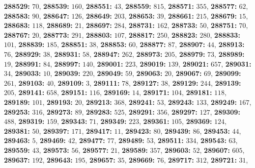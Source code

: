 \textsf{\bfseries 288529:} $70$, \textsf{\bfseries 288539:} $160$, \textsf{\bfseries 288551:} $43$, \textsf{\bfseries 288559:} $815$, \textsf{\bfseries 288571:} $355$, \textsf{\bfseries 288577:} $62$, \textsf{\bfseries 288583:} $90$, \textsf{\bfseries 288647:} $126$, \textsf{\bfseries 288649:} $203$, \textsf{\bfseries 288653:} $39$, \textsf{\bfseries 288661:} $215$, \textsf{\bfseries 288679:} $15$, \textsf{\bfseries 288683:} $118$, \textsf{\bfseries 288689:} $21$, \textsf{\bfseries 288697:} $284$, \textsf{\bfseries 288731:} $162$, \textsf{\bfseries 288733:} $50$, \textsf{\bfseries 288751:} $70$, \textsf{\bfseries 288767:} $20$, \textsf{\bfseries 288773:} $291$, \textsf{\bfseries 288803:} $107$, \textsf{\bfseries 288817:} $250$, \textsf{\bfseries 288823:} $280$, \textsf{\bfseries 288833:} $101$, \textsf{\bfseries 288839:} $185$, \textsf{\bfseries 288851:} $38$, \textsf{\bfseries 288853:} $60$, \textsf{\bfseries 288877:} $87$, \textsf{\bfseries 288907:} $44$, \textsf{\bfseries 288913:} $76$, \textsf{\bfseries 288929:} $38$, \textsf{\bfseries 288931:} $58$, \textsf{\bfseries 288947:} $262$, \textsf{\bfseries 288973:} $205$, \textsf{\bfseries 288979:} $73$, \textsf{\bfseries 288989:} $19$, \textsf{\bfseries 288991:} $84$, \textsf{\bfseries 288997:} $140$, \textsf{\bfseries 289001:} $223$, \textsf{\bfseries 289019:} $139$, \textsf{\bfseries 289021:} $657$, \textsf{\bfseries 289031:} $34$, \textsf{\bfseries 289033:} $10$, \textsf{\bfseries 289039:} $220$, \textsf{\bfseries 289049:} $59$, \textsf{\bfseries 289063:} $20$, \textsf{\bfseries 289067:} $69$, \textsf{\bfseries 289099:} $261$, \textsf{\bfseries 289103:} $40$, \textsf{\bfseries 289109:} $3$, \textsf{\bfseries 289111:} $78$, \textsf{\bfseries 289127:} $38$, \textsf{\bfseries 289129:} $244$, \textsf{\bfseries 289139:} $205$, \textsf{\bfseries 289141:} $658$, \textsf{\bfseries 289151:} $116$, \textsf{\bfseries 289169:} $14$, \textsf{\bfseries 289171:} $104$, \textsf{\bfseries 289181:} $118$, \textsf{\bfseries 289189:} $101$, \textsf{\bfseries 289193:} $20$, \textsf{\bfseries 289213:} $368$, \textsf{\bfseries 289241:} $53$, \textsf{\bfseries 289243:} $133$, \textsf{\bfseries 289249:} $167$, \textsf{\bfseries 289253:} $316$, \textsf{\bfseries 289273:} $89$, \textsf{\bfseries 289283:} $525$, \textsf{\bfseries 289291:} $356$, \textsf{\bfseries 289297:} $127$, \textsf{\bfseries 289309:} $488$, \textsf{\bfseries 289319:} $159$, \textsf{\bfseries 289343:} $71$, \textsf{\bfseries 289349:} $223$, \textsf{\bfseries 289361:} $105$, \textsf{\bfseries 289369:} $124$, \textsf{\bfseries 289381:} $50$, \textsf{\bfseries 289397:} $171$, \textsf{\bfseries 289417:} $11$, \textsf{\bfseries 289423:} $80$, \textsf{\bfseries 289439:} $86$, \textsf{\bfseries 289453:} $44$, \textsf{\bfseries 289463:} $5$, \textsf{\bfseries 289469:} $42$, \textsf{\bfseries 289477:} $77$, \textsf{\bfseries 289489:} $53$, \textsf{\bfseries 289511:} $334$, \textsf{\bfseries 289543:} $63$, \textsf{\bfseries 289559:} $43$, \textsf{\bfseries 289573:} $56$, \textsf{\bfseries 289577:} $21$, \textsf{\bfseries 289589:} $357$, \textsf{\bfseries 289603:} $52$, \textsf{\bfseries 289607:} $605$, \textsf{\bfseries 289637:} $192$, \textsf{\bfseries 289643:} $195$, \textsf{\bfseries 289657:} $35$, \textsf{\bfseries 289669:} $76$, \textsf{\bfseries 289717:} $312$, \textsf{\bfseries 289721:} $31$, 
